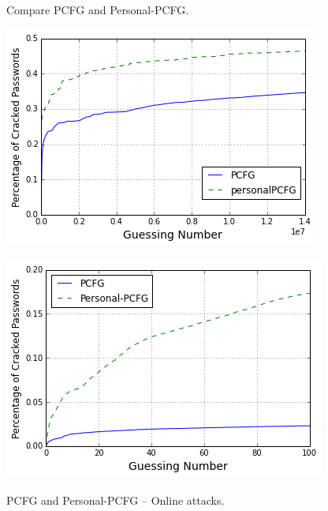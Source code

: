 \begin{figure}[h!]
\centering
\begin{minipage}{.33\textwidth}
  \captionsetup{font=scriptsize}
  \centering
  \caption{ Compare PCFG and Personal-PCFG.}{}
  \label{f3}
  \includegraphics[width=.9\linewidth]{fig/cmp}

\end{minipage}
\begin{minipage}{.33\textwidth}
  \captionsetup{font=scriptsize}
  \centering
  \caption{PCFG and Personal-PCFG -- Online attacks.}{}
  \label{cmp100}
  \includegraphics[width=.9\linewidth]{fig/cmp100}


\end{minipage}
\end{figure}
